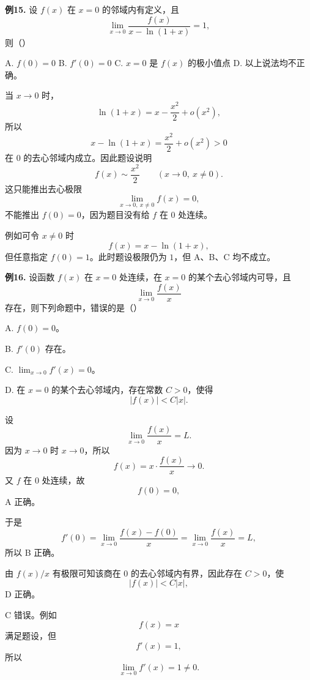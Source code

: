 \begin{problemblock}
\textbf{例15.} 设 \(f(x)\) 在 \(x=0\) 的邻域内有定义，且
\[
\lim_{x\to0}\frac{f(x)}{x-\ln(1+x)}=1,
\]
则（\quad）

A. \(f(0)=0\)
\quad B. \(f'(0)=0\)
\quad C. \(x=0\) 是 \(f(x)\) 的极小值点
\quad D. 以上说法均不正确。
\end{problemblock}
\begin{solutionblock}
当 \(x\to0\) 时，
\[
\ln(1+x)=x-\frac{x^2}{2}+o(x^2),
\]
所以
\[
x-\ln(1+x)=\frac{x^2}{2}+o(x^2)>0
\]
在 \(0\) 的去心邻域内成立。因此题设说明
\[
f(x)\sim \frac{x^2}{2}\qquad (x\to0,\ x\ne0).
\]
这只能推出去心极限
\[
\lim_{x\to0,\ x\ne0}f(x)=0,
\]
不能推出 \(f(0)=0\)，因为题目没有给 \(f\) 在 \(0\) 处连续。

例如可令 \(x\ne0\) 时
\[
f(x)=x-\ln(1+x),
\]
但任意指定 \(f(0)=1\)。此时题设极限仍为 \(1\)，但 A、B、C 均不成立。
\end{solutionblock}

\begin{problemblock}
\textbf{例16.} 设函数 \(f(x)\) 在 \(x=0\) 处连续，在 \(x=0\) 的某个去心邻域内可导，且
\[
\lim_{x\to0}\frac{f(x)}x
\]
存在，则下列命题中，错误的是（\quad）

A. \(f(0)=0\)。

B. \(f'(0)\) 存在。

C. \(\displaystyle \lim_{x\to0}f'(x)=0\)。

D. 在 \(x=0\) 的某个去心邻域内，存在常数 \(C>0\)，使得
\[
|f(x)|<C|x|.
\]
\end{problemblock}
\begin{solutionblock}
设
\[
\lim_{x\to0}\frac{f(x)}x=L.
\]
因为 \(x\to0\) 时 \(x\to0\)，所以
\[
f(x)=x\cdot\frac{f(x)}x\to0.
\]
又 \(f\) 在 \(0\) 处连续，故
\[
f(0)=0,
\]
A 正确。

于是
\[
f'(0)=\lim_{x\to0}\frac{f(x)-f(0)}x
=\lim_{x\to0}\frac{f(x)}x=L,
\]
所以 B 正确。

由 \(f(x)/x\) 有极限可知该商在 0 的去心邻域内有界，因此存在 \(C>0\)，使
\[
|f(x)|<C|x|,
\]
D 正确。

C 错误。例如
\[
f(x)=x
\]
满足题设，但
\[
f'(x)=1,
\]
所以
\[
\lim_{x\to0}f'(x)=1\ne0.
\]
\end{solutionblock}

